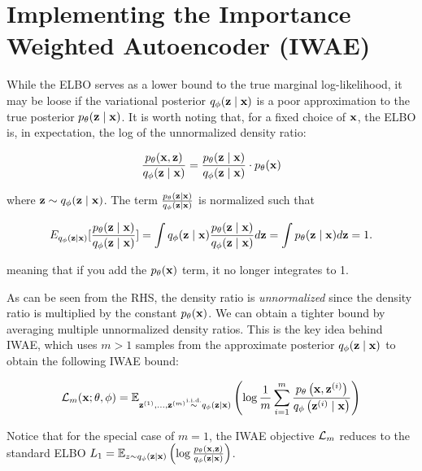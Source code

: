 \section{Implementing the Importance Weighted Autoencoder (IWAE)}

While the ELBO serves as a lower bound to the true marginal log-likelihood, it may be loose if the variational 
posterior $q_{\phi}(\mathbf{z} \mid \mathbf{x})$ is a poor approximation to the true posterior $p_{\theta}(\mathbf{z} \mid \mathbf{x})$. 
It is worth noting that, for a fixed choice of $\mathbf{x}$, the ELBO is, in expectation, the log of the unnormalized density ratio:

\begin{equation}\label{eq:12}
    \frac{p_{\theta}(\mathbf{x}, \mathbf{z})}{q_{\phi}(\mathbf{z} \mid \mathbf{x})} = \frac{p_{\theta}(\mathbf{z} \mid \mathbf{x})}{q_{\phi}(\mathbf{z} \mid \mathbf{x})} \cdot p_{\theta}(\mathbf{x})
\end{equation}

where $\mathbf{z} \sim q_{\phi}(\mathbf{z} \mid \mathbf{x})$. The term $\frac{p_{\theta}(\mathbf{z} \mid \mathbf{x})}{q_{\phi}(\mathbf{z} \mid \mathbf{x})}$ is normalized such that

\begin{equation}
    E_{q_{\phi}(\mathbf{z} \mid \mathbf{x})}[\frac{p_{\theta}(\mathbf{z} \mid \mathbf{x})}{q_{\phi}(\mathbf{z} \mid \mathbf{x})}] = \int q_{\phi}(\mathbf{z} \mid \mathbf{x})\frac{p_{\theta}(\mathbf{z} \mid \mathbf{x})}{q_{\phi}(\mathbf{z} \mid \mathbf{x})} d \mathbf{z} = \int p_{\theta}(\mathbf{z} \mid \mathbf{x}) d \mathbf{z} = 1.
\end{equation}

meaning that if you add the $p_{\theta}(\mathbf{x})$ term, it no longer integrates to 1. 

As can be seen from the RHS, the density ratio is \textit{unnormalized} since the 
density ratio is multiplied by the constant $p_{\theta}(\mathbf{x})$. We can obtain a tighter bound by averaging multiple 
unnormalized density ratios. This is the key idea behind IWAE, which uses $m > 1$ samples from the approximate posterior 
$q_{\phi}(\mathbf{z} \mid \mathbf{x})$ to obtain the following IWAE bound:

\begin{equation}\label{eq:13}
    \mathcal{L}_{m}(\mathbf{x};\theta,\phi) = \mathbb{E}_{\mathbf{z}^{(1)},...,\mathbf{z}^{(m)} \overset{\text{i.i.d.}}{\sim} q_{\phi}(\mathbf{z} \mid \mathbf{x})} \left(\log \frac{1}{m} \sum\limits_{i=1}^{m} \frac{p_{\theta}\left(\mathbf{x}, \mathbf{z}^{(i)}\right)}{q_{\phi}\left(\mathbf{z}^{(i)} \mid \mathbf{x}\right)}\right)
\end{equation}

Notice that for the special case of $m = 1$, the IWAE objective $\mathcal{L}_m$  reduces to the standard ELBO $L_1 = \mathbb{E}_{z\sim q_{\phi}(\mathbf{z} \mid \mathbf{x})}\left(\log \frac{p_{\theta}\left(\mathbf{x}, \mathbf{z}\right)}{q_{\phi}\left(\mathbf{z} \mid \mathbf{x}\right)}\right)$.

